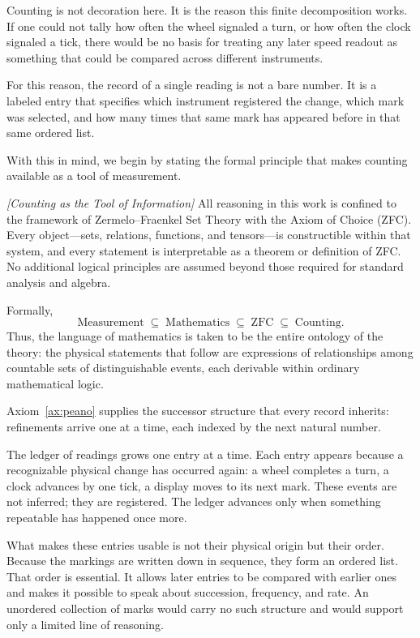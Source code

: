 Counting is not decoration here.  It is the reason this finite decomposition
works.  If one could not tally how often the wheel signaled a turn, or how often
the clock signaled a tick, there would be no basis for treating any later speed
readout as something that could be compared across different instruments.

For this reason, the record of a single reading is not a bare number.  It is a
labeled entry that specifies which instrument registered the change, which mark
was selected, and how many times that same mark has appeared before in that same
ordered list.

With this in mind, we begin by stating the formal principle that makes counting
available as a tool of measurement.


\begin{axiom}
\label{ax:peano}
\emph{[Counting as the Tool of Information]}
All reasoning in this work is confined to the framework of Zermelo--Fraenkel
Set Theory with the Axiom of Choice (ZFC).
Every object---sets, relations, functions, and tensors---is
constructible within that system, and every statement is interpretable
as a theorem or definition of ZFC.  No additional logical principles
are assumed beyond those required for standard analysis and algebra.

Formally,
\[
\mathrm{Measurement} \;\subseteq\; \mathrm{Mathematics} \;\subseteq\; \mathrm{ZFC} \;\subseteq\; \mathrm{Counting}.
\]
Thus, the language of mathematics is taken to be the entire ontology of
the theory: the physical statements that follow are expressions of
relationships among countable sets of distinguishable events, each
derivable within ordinary mathematical logic.
\end{axiom}

Axiom~\ref{ax:peano} supplies the successor structure that every 
record inherits: refinements arrive one at a time, each indexed by the next
natural number.  


The ledger of readings grows one entry at a time. Each entry appears because a
recognizable physical change has occurred again: a wheel completes a turn, a
clock advances by one tick, a display moves to its next mark. These events are
not inferred; they are registered. The ledger advances only when something
repeatable has happened once more.

What makes these entries usable is not their physical origin but their order.
Because the markings are written down in sequence, they form an ordered list.
That order is essential. It allows later entries to be compared with earlier
ones and makes it possible to speak about succession, frequency, and rate. An
unordered collection of marks would carry no such structure and would support
only a limited line of reasoning.

